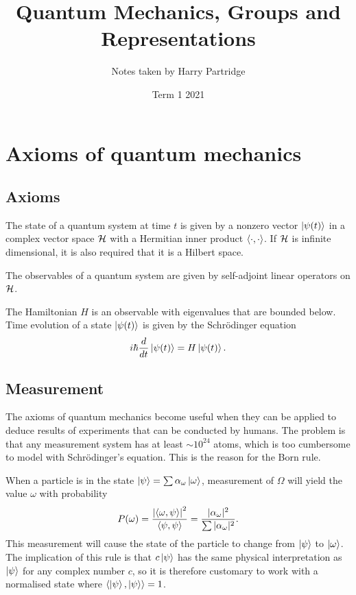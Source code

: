 \documentclass[a4paper]{article}
\title{Quantum Mechanics, Groups and Representations}
\author{Notes taken by Harry Partridge}
\date{Term 1 2021}
\begin{document}
\maketitle

\tableofcontents

\newpage
\section{Axioms of quantum mechanics} 
\subsection{Axioms}
\begin{axiom}[State]
    The state of a quantum system at time $t$ is given by a nonzero vector $\left\lvert \psi(t) \right\rangle$ in a complex vector space $\mathcal{H}$ with a Hermitian inner product $\left\langle \cdot , \cdot \right\rangle$. If $\mathcal{H}$ is infinite dimensional, it is also required that it is a Hilbert space.
\end{axiom}
\begin{axiom}[Observable]
    The observables of a quantum system are given by self-adjoint linear operators on $\mathcal{H}$. 
\end{axiom}
\begin{axiom}
    The Hamiltonian $H$ is an observable with eigenvalues that are bounded below. Time evolution of a state $\left\lvert \psi(t) \right\rangle$ is given by the Schr\"{o}dinger equation $$i\hbar\frac{d}{dt}\left\lvert \psi(t) \right\rangle = H\left\lvert \psi(t) \right\rangle.$$ 
\end{axiom}

\subsection{Measurement}
The axioms of quantum mechanics become useful when they can be applied to deduce results of experiments that can be conducted by humans. The problem is that any measurement system has at least $\sim 10^{24}$ atoms, which is too cumbersome to model with Schr\"{o}dinger's equation. This is the reason for the Born rule.

\begin{princ}
    When a particle is in the state $\left\lvert \psi \right\rangle = \sum \alpha_\omega \left\lvert \omega \right\rangle$, measurement of $\Omega$ will yield the value $\omega$ with probability $$P(\omega) = \frac{\left\lvert \left\langle \omega , \psi \right\rangle \right\rvert^2}{\left\langle \psi , \psi \right\rangle} = \frac{|\alpha_\omega|^2}{\sum |\alpha_\omega|^2}.$$ This measurement will cause the state of the particle to change from $\left\lvert \psi \right\rangle$ to $\left\lvert \omega \right\rangle$. The implication of this rule is that $c\left\lvert \psi \right\rangle$ has the same physical interpretation as $\left\lvert \psi \right\rangle$ for any complex number $c$, so it is therefore customary to work with a normalised state where $\left\langle \left\lvert \psi \right\rangle , \left\lvert \psi \right\rangle \right\rangle = 1$.
\end{princ}
\end{document}
